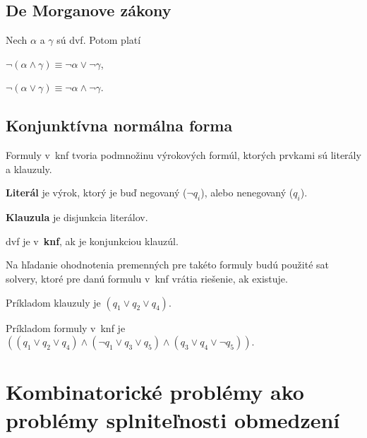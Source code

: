\subsection{De Morganove zákony}\label{sec:propositional_logic:demorgan}
\begin{theorem} \cite{demorgan2022}
    Nech $\alpha$ a $\gamma$ sú \acrshort{dvf}. Potom platí
    \begin{center}
        $\lnot(\alpha \land \gamma) \equiv \lnot \alpha \lor \lnot \gamma$,
    \end{center}
    \begin{center}
        $\lnot(\alpha \lor \gamma) \equiv \lnot \alpha \land \lnot \gamma$.
    \end{center}
\end{theorem}

\subsection{Konjunktívna normálna forma}\label{sec:propositional_logic:knf}
Formuly v~\acrshort{knf} tvoria podmnožinu výrokových formúl, ktorých prvkami sú literály a klauzuly.

\begin{definition} \textbf{Literál} je výrok, ktorý je buď negovaný ($\lnot q_i$), alebo nenegovaný ($q_i$).
\end{definition}

\begin{definition} \textbf{Klauzula} je disjunkcia literálov.
\end{definition}

\begin{definition}
    \Acrshort{dvf} je v~\textbf{\acrshort{knf}}, ak je konjunkciou klauzúl.
\end{definition}

Na hľadanie ohodnotenia premenných pre takéto formuly budú použité \acrshort{sat} solvery, ktoré pre danú formulu v~\acrshort{knf} vrátia riešenie, ak existuje.

\begin{example}
    Príkladom klauzuly je $(q_1 \lor q_2 \lor q_4)$.
\end{example}

\begin{example}
    Príkladom formuly v~knf je $((q_1 \lor q_2 \lor q_4) \land (\lnot q_1 \lor q_3 \lor q_5) \land (q_3 \lor q_4 \lor \lnot q_5))$.
\end{example}

\section{Kombinatorické problémy ako problémy splniteľnosti obmedzení}\label{sec:combinatorics}


